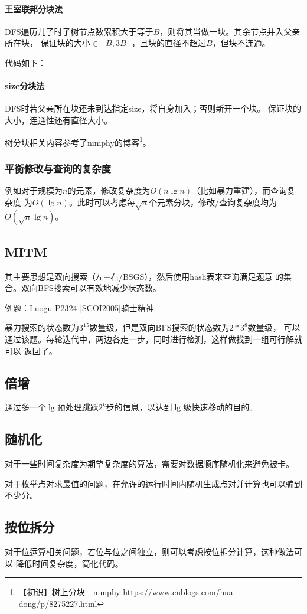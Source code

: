 \paragraph{王室联邦分块法}
DFS遍历儿子时子树节点数累积大于等于$B$，则将其当做一块。其余节点并入父亲所在块，
保证块的大小$\in [B,3B]$，且块的直径不超过$B$，但块不连通。

代码如下：

\paragraph{size分块法}
DFS时若父亲所在块还未到达指定size，将自身加入；否则新开一个块。
保证块的大小，连通性还有直径大小。

树分块相关内容参考了nimphy的博客\footnote{
	【初识】树上分块 - nimphy
	\url{https://www.cnblogs.com/hua-dong/p/8275227.html}
}。
\subsubsection{平衡修改与查询的复杂度}
例如对于规模为$n$的元素，修改复杂度为$O(n\lg n)$（比如暴力重建），而查询复杂度
为$O(\lg n)$。此时可以考虑每$\sqrt{n}$个元素分块，修改/查询复杂度均为
$O(\sqrt{n}\lg n)$。
\subsection{MITM}
其主要思想是双向搜索（左+右/BSGS），然后使用hash表来查询满足题意
的集合。双向BFS搜索可以有效地减少状态数。

例题：Luogu P2324 [SCOI2005]骑士精神

暴力搜索的状态数为$3^{15}$数量级，但是双向BFS搜索的状态数为$2*3^8$数量级，
可以通过该题。每轮迭代中，两边各走一步，同时进行检测，这样做找到一组可行解就可以
返回了。


\subsection{倍增}
通过多一个$\lg$预处理跳跃$2^k$步的信息，以达到$\lg$级快速移动的目的。
\subsection{随机化}
对于一些时间复杂度为期望复杂度的算法，需要对数据顺序随机化来避免被卡。

对于枚举点对求最值的问题，在允许的运行时间内随机生成点对并计算也可以骗到不少分。
\subsection{按位拆分}
对于位运算相关问题，若位与位之间独立，则可以考虑按位拆分计算，这种做法可以
降低时间复杂度，简化代码。
